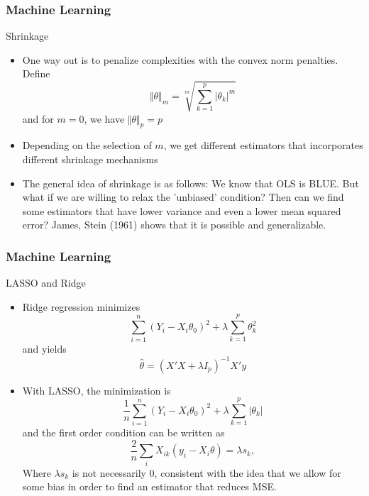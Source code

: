 \documentclass{beamer}
\begin{document}
\begin{frame}
\frametitle{Machine Learning}
Shrinkage
\begin{itemize}
\item One way out is to penalize complexities with the convex norm penalties. Define
\[
\Vert \theta \Vert _m = \sqrt[m]{\sum_{k=1}^p \vert \theta_k \vert ^m}
\]
and for $m=0$, we have $\Vert \theta \Vert _p=p$
\item Depending on the selection of $m$, we get different estimators that incorporates different shrinkage mechanisms 
\item The general idea of shrinkage is as follows: We know that OLS is BLUE. But what if we are willing to relax the 'unbiased' condition? Then can we find some estimators that have lower variance and even a lower mean squared error? James, Stein (1961) shows that it is possible and generalizable.
\end{itemize}
\end{frame}

\begin{frame}
\frametitle{Machine Learning}
LASSO and Ridge
\begin{itemize}
\item Ridge regression minimizes
\[
\sum_{i=1}^n(Y_i-X_i\theta_0)^2+\lambda\sum_{k=1}^p \theta_k^2 
\]
and yields
\[
\hat{\theta} = (X'X+\lambda I_p)^{-1}X'y
\]
\item With LASSO, the minimization is 
\[
\frac{1}{n}\sum_{i=1}^n(Y_i-X_i\theta_0)^2+\lambda\sum_{k=1}^p |\theta_k| 
\]
and the first order condition can be written as
\[
\frac{2}{n}\sum_i X_{ik}(y_i-X_i\theta)=\lambda s_k,
\]
Where $\lambda s_k$ is not necessarily 0, consistent with the idea that we allow for some bias in order to find an estimator that reduces MSE. 
\end{itemize}
\end{frame}
\end{document}
